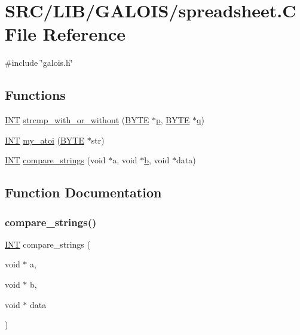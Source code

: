 \hypertarget{spreadsheet_8_c}{}\section{S\+R\+C/\+L\+I\+B/\+G\+A\+L\+O\+I\+S/spreadsheet.C File Reference}
\label{spreadsheet_8_c}
{\ttfamily \#include \char`\"{}galois.\+h\char`\"{}}\newline
\subsection*{Functions}
\begin{DoxyCompactItemize}
\item 
\mbox{\hyperlink{galois_8h_a09fddde158a3a20bd2dcadb609de11dc}{I\+NT}} \mbox{\hyperlink{spreadsheet_8_c_a752bd7c2ce7c1dbd31fca65d0502be72}{strcmp\+\_\+with\+\_\+or\+\_\+without}} (\mbox{\hyperlink{galois_8h_ab6cc7b4aeb6ea31aba2b3fbfc83ff5e6}{B\+Y\+TE}} $\ast$\mbox{\hyperlink{alphabet2_8_c_a533391314665d6bf1b5575e9a9cd8552}{p}}, \mbox{\hyperlink{galois_8h_ab6cc7b4aeb6ea31aba2b3fbfc83ff5e6}{B\+Y\+TE}} $\ast$\mbox{\hyperlink{simeon_8_c_a92cbb483a3b27ae1a0dbfcb125ce216f}{q}})
\item 
\mbox{\hyperlink{galois_8h_a09fddde158a3a20bd2dcadb609de11dc}{I\+NT}} \mbox{\hyperlink{spreadsheet_8_c_a1ca6279102ce52b89b955c6470bb7a3c}{my\+\_\+atoi}} (\mbox{\hyperlink{galois_8h_ab6cc7b4aeb6ea31aba2b3fbfc83ff5e6}{B\+Y\+TE}} $\ast$str)
\item 
\mbox{\hyperlink{galois_8h_a09fddde158a3a20bd2dcadb609de11dc}{I\+NT}} \mbox{\hyperlink{spreadsheet_8_c_a47b05365c9803f32f264eb321dde8f96}{compare\+\_\+strings}} (void $\ast$a, void $\ast$\mbox{\hyperlink{alphabet2_8_c_a148e3876077787926724625411d6e7a9}{b}}, void $\ast$data)
\end{DoxyCompactItemize}


\subsection{Function Documentation}
\mbox{\label{spreadsheet_8_c_a47b05365c9803f32f264eb321dde8f96}} 
\subsubsection{\texorpdfstring{compare\+\_\+strings()}{compare\_strings()}}
{\footnotesize\ttfamily \mbox{\hyperlink{galois_8h_a09fddde158a3a20bd2dcadb609de11dc}{I\+NT}} compare\+\_\+strings (\begin{DoxyParamCaption}\item[{void $\ast$}]{a,  }\item[{void $\ast$}]{b,  }\item[{void $\ast$}]{data }\end{DoxyParamCaption})}

